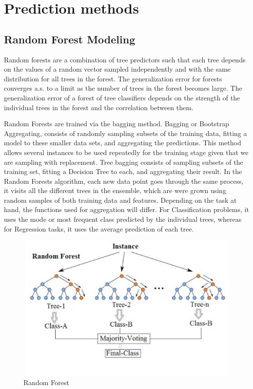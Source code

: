 \section{Prediction methods}
\subsection{Random Forest Modeling}
Random forests are a combination of tree predictors
such that each tree depends on the values of a random
vector sampled independently and with the same
distribution for all trees in the forest. The
generalization error for forests converges a.s. to a limit
as the number of trees in the forest becomes large.
The generalization error of a forest of tree classifiers
depends on the strength of the individual trees in the
forest and the correlation between them. 
\par
Random Forests are trained via the bagging method. Bagging or Bootstrap Aggregating, consists of randomly sampling subsets of the training data, fitting a model to these smaller data sets, and aggregating the predictions. This method allows several instances to be used repeatedly for the training stage given that we are sampling with replacement. Tree bagging consists of sampling subsets of the training set, fitting a Decision Tree to each, and aggregating their result.
In the Random Forests algorithm, each new data point goes through the same process, it visits all the different trees in the ensemble, which are were grown using random samples of both training data and features. Depending on the task at hand, the functions used for aggregation will differ. For Classification problems, it uses the mode or most frequent class predicted by the individual trees, whereas for Regression tasks, it uses the average prediction of each tree.
\begin{figure}[h]
\label{ss}
\centering
\includegraphics[width= 10 cm]{rf.png}
\caption{Random Forest}
\end{figure}
